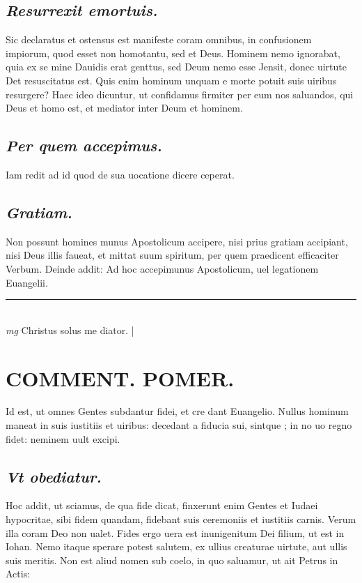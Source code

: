 \documentclass{article}
\begin{document}
\begin{pages}
\subsection*{\textit{Resurrexit emortuis. }}\pstart Sic declaratus et ostensus est manifeste coram omnibus, in confusionem impiorum, quod esset non homotantu, sed et Deus. Hominem nemo ignorabat, quia ex se mine Dauidis erat genttus, sed Deum nemo esse Jensit, donec uirtute Det resuscitatus est. Quis enim hominum unquam e morte potuit suis uiribus resurgere? Haec ideo dicuntur, ut confidamus firmiter per eum nos saluandos, qui Deus et homo est, et mediator inter Deum et hominem.   \pend
{}
{}
\subsection*{\textit{Per quem accepimus. }}\pstart Iam redit ad id quod de sua uocatione dicere ceperat.   \pend
{}
{}
\subsection*{\textit{Gratiam. }}\pstart Non possunt homines munus Apostolicum accipere, nisi prius gratiam accipiant, nisi Deus illis faueat, et mittat suum spiritum, per quem praedicent efficaciter Verbum. Deinde addit: Ad hoc accepimunus Apostolicum, uel legationem Euangelii.   \pend
\vspace{0.5cm}\noindent
\vspace{0.2cm}\rule{1cm}{0.2pt}\\ 
\hspace{0.2cm}\textit{mg}
\footnotesize Christus solus me diator.  
\normalsize| 
\section*{COMMENT. POMER.  }\pstart Id est, ut omnes Gentes subdantur fidei, et cre dant Euangelio. Nullus hominum maneat in suis iustitiis et uiribus: decedant a fiducia sui, sintque ; in no uo regno fidet: neminem uult excipi.  \pend
{}
{}
\subsection*{\textit{Vt obediatur. }}\pstart Hoc addit, ut sciamus, de qua fide dicat, finxerunt enim Gentes et Iudaei hypocritae, sibi fidem quandam, fidebant suis ceremoniis et iustitiis carnis. Verum illa coram Deo non ualet. Fides ergo uera est inunigenitum Dei filium, ut est in Iohan. Nemo itaque  sperare potest salutem, ex ullius creaturae uirtute, aut ullis suis meritis. Non est aliud nomen sub coelo, in quo saluamur, ut ait Petrus in Actis:  \pend
{}
{}

\end{pages}
\end{document}
